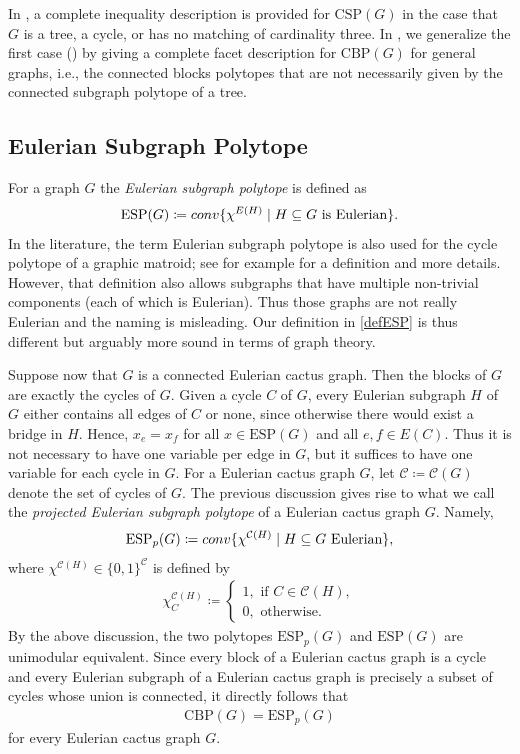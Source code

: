 \documentclass[12pt]{amsart}
\newcommand{\C}{\mathcal{C}}
\newcommand{\conv}{\mathop{\rm conv}\nolimits}
\newcommand{\ESP}{\mathrm{ESP}}
\newcommand{\CBP}{\mathrm{CBP}}
\newcommand{\CSP}{\mathrm{CSP}}
\begin{document}
In \cite{DKN15}, a complete inequality description is provided for $\CSP(G)$ in the case that $G$ is a tree, a cycle, or has no matching of cardinality three. In , we generalize the first case (\cite[Theorem 6]{DKN15}) by giving a complete facet description for $\CBP(G)$ for general graphs, i.e., the connected blocks polytopes that are not necessarily given by the connected subgraph polytope of a tree.

\subsection{Eulerian Subgraph Polytope}

For a graph $G$ the \textit{Eulerian subgraph polytope} is defined as
\begin{align}
    \label{defESP}
    \mathrm{ESP}(G) \coloneqq \conv\{ \chi^{E(H)} \mid H \subseteq G \text{ is Eulerian} \}.
\end{align}
In the literature, the term Eulerian subgraph polytope is also used for the cycle polytope of a graphic matroid; see for example \cite{cyclepolytope} for a definition and more details. However, that definition also allows subgraphs that have multiple non-trivial components (each of which is Eulerian). Thus those graphs are not really Eulerian and the naming is misleading. Our definition in \eqref{defESP} is thus different but arguably more sound in terms of graph theory.

Suppose now that $G$ is a connected Eulerian cactus graph. Then the blocks of $G$ are exactly the cycles of $G$. Given a cycle $C$ of $G$, every Eulerian subgraph $H$ of $G$ either contains all edges of $C$ or none, since otherwise there would exist a bridge in $H$. Hence, $x_e=x_f$ for all $x \in \mathrm{ESP}(G)$ and all $e,f \in E(C)$. Thus it is not necessary to have one variable per edge in $G$, but it suffices to have one variable for each cycle in $G$. For a Eulerian cactus graph $G$, let $\C \coloneqq \C(G)$ denote the set of cycles of $G$. The previous discussion gives rise to what we call the \textit{projected Eulerian subgraph polytope} of a Eulerian cactus graph $G$. Namely,
\begin{align*}
    \mathrm{ESP}_p(G)\coloneqq \conv\{\chi^{\C(H)} \mid H \subseteq G \text{ Eulerian} \},
\end{align*}
where $\chi^{\C(H)} \in \{0,1\}^\C$ is defined by
\begin{align*}
    \chi^{\C(H)}_C \coloneqq \begin{cases} 1, \text{ if } C \in \C(H), \\
                                   0, \text{ otherwise.}\end{cases}
\end{align*}
By the above discussion, the two polytopes $\ESP_p(G)$ and $\ESP(G)$ are unimodular equivalent. Since every block of a Eulerian cactus graph is a cycle and every Eulerian subgraph of a Eulerian cactus graph is precisely a subset of cycles whose union is connected, it directly follows that
\begin{align*}
    \CBP(G)=\ESP_p(G)
\end{align*}
for every Eulerian cactus graph $G$.
\end{document}
